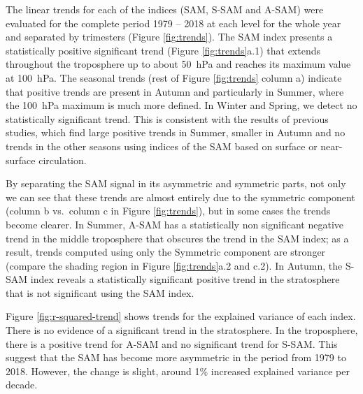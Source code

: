 \documentclass[smallextended]{svjour3}       %
\begin{document}
The linear trends for each of the indices (SAM, S\nobreakdash-SAM and A\nobreakdash-SAM) were evaluated for the complete period 1979 -- 2018 at each level for the whole year and separated by trimesters (Figure \ref{fig:trends}). The SAM index presents a statistically positive significant trend (Figure \ref{fig:trends}a.1) that extends throughout the troposphere up to about 50~hPa and reaches its maximum value at 100~hPa. The seasonal trends (rest of Figure \ref{fig:trends} column a) indicate that positive trends are present in Autumn and particularly in Summer, where the 100~hPa maximum is much more defined. In Winter and Spring, we detect no statistically significant trend. This is consistent with the results of previous studies, which find large positive trends in Summer, smaller in Autumn and no trends in the other seasons \citep[e.g.][ and references therein]{fogt2020} using indices of the SAM based on surface or near-surface circulation.

By separating the SAM signal in its asymmetric and symmetric parts, not only we can see that these trends are almost entirely due to the symmetric component (column b vs.~column c in Figure \ref{fig:trends}), but in some cases the trends become clearer. In Summer, A\nobreakdash-SAM has a statistically non significant negative trend in the middle troposphere that obscures the trend in the SAM index; as a result, trends computed using only the Symmetric component are stronger (compare the shading region in Figure \ref{fig:trends}a.2 and c.2). In Autumn, the S\nobreakdash-SAM index reveals a statistically significant positive trend in the stratosphere that is not significant using the SAM index.

Figure \ref{fig:r-squared-trend} shows trends for the explained variance of each index. There is no evidence of a significant trend in the stratosphere. In the troposphere, there is a positive trend for A\nobreakdash-SAM and no significant trend for S\nobreakdash-SAM. This suggest that the SAM has become more asymmetric in the period from 1979 to 2018. However, the change is slight, around 1\% increased explained variance per decade.
\end{document}

